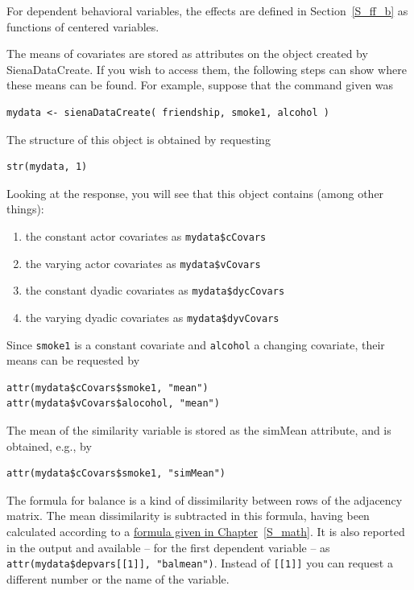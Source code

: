 \documentclass[a4paper,fleqn,11pt]{article}
\newcommand{\+}{\, + \,}
\newcommand{\sfn}[1]{\textsf{#1}}
\begin{document}
{For dependent behavioral variables, the effects are defined
in Section~\ref{S_ff_b} as functions of centered variables.

The means of covariates are stored as attributes on the object created by
\sfn{SienaDataCreate}.
If you wish to access them, the following steps can show
where these means can be found.
For example, suppose that the command given was
\begin{verbatim}
mydata <- sienaDataCreate( friendship, smoke1, alcohol )
\end{verbatim}
The structure of this object is obtained by requesting
\begin{verbatim}
str(mydata, 1)
\end{verbatim}
Looking at the response, you
will see that this object contains (among other things):
\begin{enumerate}
\item the constant actor covariates as \texttt{mydata\$cCovars}
\item the varying actor covariates as \texttt{mydata\$vCovars}
\item the constant dyadic covariates as \texttt{mydata\$dycCovars}
\item the varying dyadic covariates as \texttt{mydata\$dyvCovars}
\end{enumerate}
Since \texttt{smoke1} is a constant covariate and \texttt{alcohol}
a changing covariate, their means can be requested by
\begin{verbatim}
attr(mydata$cCovars$smoke1, "mean")
attr(mydata$vCovars$alocohol, "mean")
\end{verbatim}
The mean of the similarity variable is stored as the \sfn{simMean} attribute,
and is obtained, e.g., by
\begin{verbatim}
attr(mydata$cCovars$smoke1, "simMean")
\end{verbatim}

The formula for balance is a kind of dissimilarity between rows of
the adjacency matrix. The mean dissimilarity is subtracted in this
formula, having been calculated according to a
\hyperlink{T_meanbal}{formula given in Chapter}~\ref{S_math}.
It is also reported in the output and available -- for the first
dependent variable -- as \texttt{attr(mydata\$depvars[[1]], "balmean")}.
Instead of \texttt{[[1]]} you can request a different number or
the name of the variable.


}
\end{document}
